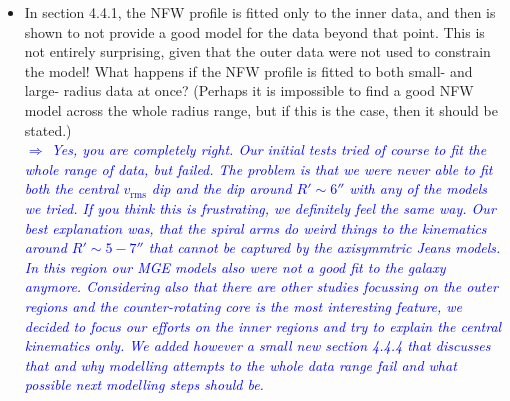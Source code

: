 \documentclass[10pt,a4paper]{article}
\newcommand{\Comment}[1]{\textsl{\textcolor{Blue}{$\Longrightarrow$ {#1}}}}
\begin{document}
\begin{itemize}
\item In section 4.4.1, the NFW profile is fitted only to the inner data, and then is
shown to not provide a good model for the data beyond that point. This is not
entirely surprising, given that the outer data were not used to constrain the model!
What happens if the NFW profile is fitted to both small- and large- radius data at
once? (Perhaps it is impossible to find a good NFW model across the whole radius
range, but if this is the case, then it should be stated.) \\\Comment{Yes, you are completely right. Our initial tests tried of course to fit the whole range of data, but failed. The problem is that we were never able to fit both the central $v_\text{rms}$ dip and the dip around $R'\sim 6''$ with any of the models we tried. If you think this is frustrating, we definitely feel the same way. Our best explanation was, that the spiral arms do weird things to the kinematics around $R'\sim 5-7''$ that cannot be captured by the axisymmtric Jeans models. In this region our MGE models also were not a good fit to the galaxy anymore. Considering also that there are other studies focussing on the outer regions and the counter-rotating core is the most interesting feature, we decided to focus our efforts on the inner regions and try to explain the central kinematics only. We added however a small new section 4.4.4 that discusses that and why modelling attempts to the whole data range fail and what possible next modelling steps should be.}


\end{itemize}
\end{document}
